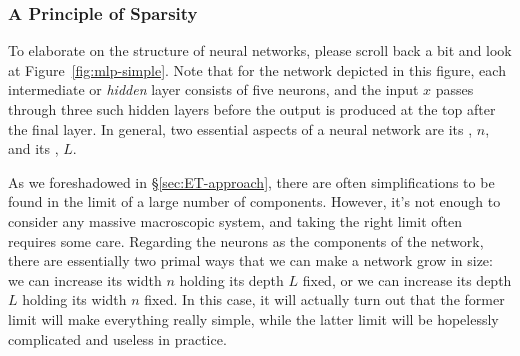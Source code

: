 \subsubsection{A Principle of Sparsity}
To elaborate on the structure of neural networks, please scroll back a bit and look at Figure~\ref{fig:mlp-simple}.
Note that for the network depicted in this figure, each intermediate or \emph{hidden} layer consists of five neurons, and the input $x$ passes through three such hidden layers before the output is produced at the top after the final layer. In general, two essential aspects of a neural network  are its , $n$, and its , $L$. 











As we foreshadowed in \S\ref{sec:ET-approach}, there are often simplifications to be found in the limit of a large number of components. %
However, it's not enough to consider any massive macroscopic system, and taking the right limit often requires some care.
Regarding the neurons as the components of the network, there are essentially two primal ways that we can make a network grow in size: we can increase its width $n$ holding its depth $L$ fixed, or we can increase its depth $L$ holding its width $n$ fixed.
In this case, it will actually turn out that the former limit will make everything really simple, while the latter limit will be hopelessly complicated and useless in practice.

